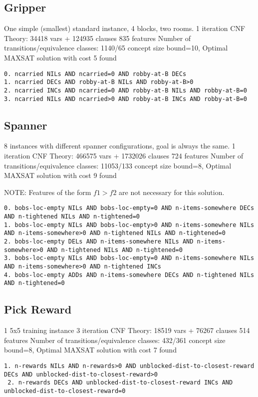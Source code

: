 \documentclass[a4paper]{article}
\begin{document}
\subsection{Gripper}
One simple (smallest) standard instance, 4 blocks, two rooms.
1 iteration
CNF Theory: 34418 vars + 124935 clauses
835 features
Number of transitions/equivalence classes: 1140/65
concept size bound=10,
Optimal MAXSAT solution with cost 5 found

\begin{Verbatim}[fontsize=\footnotesize]
0. ncarried NILs AND ncarried=0 AND robby-at-B DECs
1. ncarried DECs AND robby-at-B NILs AND robby-at-B>0
2. ncarried INCs AND ncarried=0 AND robby-at-B NILs AND robby-at-B=0
3. ncarried NILs AND ncarried>0 AND robby-at-B INCs AND robby-at-B=0
\end{Verbatim}


\subsection{Spanner}
8 instances with different spanner configurations, goal is always the same.
1 iteration
CNF Theory: 466575 vars + 1732026 clauses
724 features
Number of transitions/equivalence classes: 11053/133
concept size bound=8,
Optimal MAXSAT solution with cost 9 found

NOTE: Features of the form $f1>f2$ are not necessary for this solution.

\begin{Verbatim}[fontsize=\footnotesize]
0. bobs-loc-empty NILs AND bobs-loc-empty=0 AND n-items-somewhere DECs AND n-tightened NILs AND n-tightened=0
1. bobs-loc-empty NILs AND bobs-loc-empty>0 AND n-items-somewhere NILs AND n-items-somewhere>0 AND n-tightened NILs AND n-tightened=0
2. bobs-loc-empty DELs AND n-items-somewhere NILs AND n-items-somewhere>0 AND n-tightened NILs AND n-tightened=0
3. bobs-loc-empty NILs AND bobs-loc-empty=0 AND n-items-somewhere NILs AND n-items-somewhere>0 AND n-tightened INCs
4. bobs-loc-empty ADDs AND n-items-somewhere DECs AND n-tightened NILs AND n-tightened=0
\end{Verbatim}

\subsection{Pick Reward}
1 5x5 training instance
3 iteration
CNF Theory: 18519 vars + 76267 clauses
514 features
Number of transitions/equivalence classes: 432/361
concept size bound=8,
Optimal MAXSAT solution with cost 7 found

\begin{Verbatim}[fontsize=\footnotesize]
 1. n-rewards NILs AND n-rewards>0 AND unblocked-dist-to-closest-reward DECs AND unblocked-dist-to-closest-reward>0
 2. n-rewards DECs AND unblocked-dist-to-closest-reward INCs AND unblocked-dist-to-closest-reward=0
\end{Verbatim}




\end{document}
